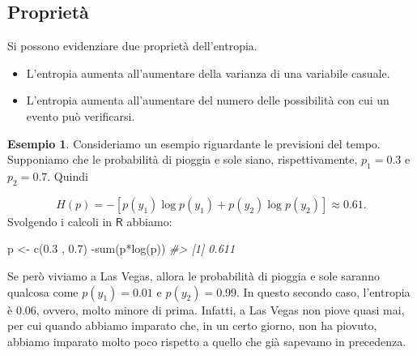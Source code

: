 \documentclass[
  10pt,
  italian,
  a4paper,
  extrafontsizes,onecolumn,openright
  ]{memoir}
\newenvironment{Shaded}{\begin{snugshade}}{\end{snugshade}}
\newcommand{\CommentTok}[1]{\textcolor[rgb]{0.56,0.35,0.01}{\textit{#1}}}
\newcommand{\FloatTok}[1]{\textcolor[rgb]{0.00,0.00,0.81}{#1}}
\newcommand{\FunctionTok}[1]{\textcolor[rgb]{0.00,0.00,0.00}{#1}}
\newcommand{\NormalTok}[1]{#1}
\newcommand{\OtherTok}[1]{\textcolor[rgb]{0.56,0.35,0.01}{#1}}
\newcommand{\SpecialCharTok}[1]{\textcolor[rgb]{0.00,0.00,0.00}{#1}}
\providecommand{\tightlist}{%
  \setlength{\itemsep}{0pt}\setlength{\parskip}{0pt}}
\newcommand{\R}{\textsf{R}} %
\theoremstyle{definition}
\theoremstyle{definition}
\newtheorem{example}{Esempio}[chapter]
\theoremstyle{definition}
\theoremstyle{definition}
\theoremstyle{remark}
\begin{document}
\hypertarget{proprietuxe0}{%
\subsection{Proprietà}\label{proprietuxe0}}

Si possono evidenziare due proprietà dell'entropia.

\begin{itemize}
\tightlist
\item
  L'entropia aumenta all'aumentare della varianza di una variabile casuale.
\item
  L'entropia aumenta all'aumentare del numero delle possibilità con cui un evento può verificarsi.
\end{itemize}

\begin{example}
Consideriamo un esempio riguardante le previsioni del tempo. Supponiamo che le probabilità di pioggia e sole siano, rispettivamente, \(p_1 = 0.3\) e \(p_2 = 0.7\). Quindi

\[
H(p) = − [p(y_1) \log p(y_1) + p(y_2) \log p(y_2)] \approx 0.61.
\]
\noindent
Svolgendo i calcoli in \(\R\) abbiamo:

\begin{Shaded}
\begin{Highlighting}[]
\NormalTok{p }\OtherTok{\textless{}{-}} \FunctionTok{c}\NormalTok{(}\FloatTok{0.3}\NormalTok{ , }\FloatTok{0.7}\NormalTok{)}
\SpecialCharTok{{-}}\FunctionTok{sum}\NormalTok{(p}\SpecialCharTok{*}\FunctionTok{log}\NormalTok{(p))}
\CommentTok{\#\textgreater{} [1] 0.611}
\end{Highlighting}
\end{Shaded}

\noindent
Se però viviamo a Las Vegas, allora le probabilità di pioggia e sole saranno qualcosa come \(p(y_1) = 0.01\) e \(p(y_2) = 0.99\). In questo secondo caso, l'entropia è 0.06, ovvero, molto minore di prima. Infatti, a Las Vegas non piove quasi mai, per cui quando abbiamo imparato che, in un certo giorno, non ha piovuto, abbiamo imparato molto poco rispetto a quello che già sapevamo in precedenza.
\end{example}
\end{document}
